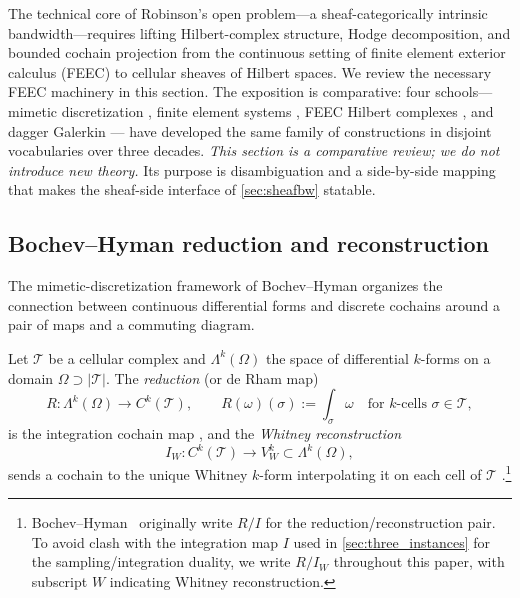 %

The technical core of Robinson's open problem---a sheaf-categorically
intrinsic bandwidth---requires lifting Hilbert-complex structure,
Hodge decomposition, and bounded cochain projection from the
continuous setting of finite element exterior calculus (FEEC) to
cellular sheaves of Hilbert spaces. We review the necessary FEEC
machinery in this section. The exposition is comparative: four
schools---mimetic discretization \cite{BochevHyman2006}, finite
element systems \cite{Christiansen2010}, FEEC Hilbert complexes
\cite{AFW2010}, and dagger Galerkin \cite{LahtinenStenvall2020}---
have developed the same family of constructions in disjoint
vocabularies over three decades. \emph{This section is a
comparative review; we do not introduce new theory.} Its purpose is
disambiguation and a side-by-side mapping that makes the
sheaf-side interface of \cref{sec:sheafbw} statable.

\subsection{Bochev--Hyman reduction and reconstruction}\label{subsec:feec-bh}

The mimetic-discretization framework of Bochev--Hyman
\cite{BochevHyman2006} organizes the connection between continuous
differential forms and discrete cochains around a pair of maps and a
commuting diagram.

\begin{definition}\label{def:bh-RI}
Let $\mathcal{T}$ be a cellular complex and $\Lambda^k(\Omega)$ the
space of differential $k$-forms on a domain $\Omega \supset
\lvert \mathcal{T} \rvert$. The \emph{reduction} (or de Rham map)
\[
  R : \Lambda^k(\Omega) \longrightarrow C^k(\mathcal{T}),
  \qquad
  R(\omega)(\sigma) := \int_\sigma \omega
  \quad\text{for $k$-cells } \sigma \in \mathcal{T},
\]
is the integration cochain map \cite[\S 1]{BochevHyman2006}, and the
\emph{Whitney reconstruction}
\[
  I_W : C^k(\mathcal{T}) \longrightarrow V_W^k \subset \Lambda^k(\Omega),
\]
sends a cochain to the unique Whitney $k$-form interpolating it on
each cell of $\mathcal{T}$
\cite{Whitney1957,Bossavit1988}.\footnote{Bochev--Hyman~%
\cite{BochevHyman2006} originally write $R/I$ for the
reduction/reconstruction pair. To avoid clash with the integration
map $I$ used in \cref{sec:three_instances} for the
sampling/integration duality, we write $R/I_W$ throughout this paper,
with subscript $W$ indicating Whitney reconstruction.}
\end{definition}

